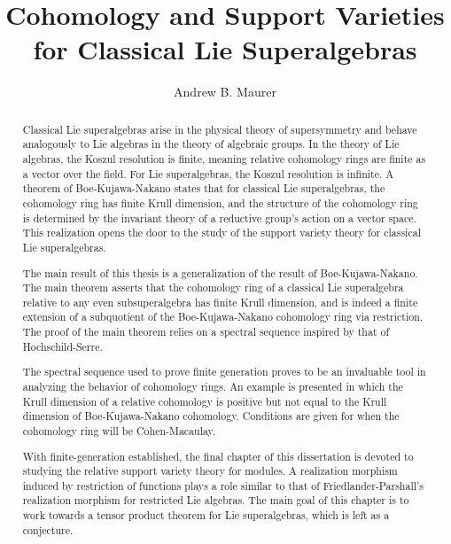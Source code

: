\documentclass[12pt]{report}
\title{Cohomology and Support Varieties\\
  for Classical Lie Superalgebras}
\author{Andrew B. Maurer}
\begin{document}

\begin{abstract}
  Classical Lie superalgebras arise in the physical theory of supersymmetry and behave analogously to Lie algebras in the theory of algebraic groups. In the theory of Lie algebras, the Koszul resolution is finite, meaning relative cohomology rings are finite as a vector over the field. For Lie superalgebras, the Koszul resolution is infinite. A theorem of Boe-Kujawa-Nakano states that for classical Lie superalgebras, the cohomology ring has finite Krull dimension, and the structure of the cohomology ring is determined by the invariant theory of a reductive group's action on a vector space. This realization opens the door to the study of the support variety theory for classical Lie superalgebras.
  
  The main result of this thesis is a generalization of the result of Boe-Kujawa-Nakano. The main theorem asserts that the cohomology ring of a classical Lie superalgebra relative to any even subsuperalgebra has finite Krull dimension, and is indeed a finite extension of a subquotient of the Boe-Kujawa-Nakano cohomology ring via restriction. The proof of the main theorem relies on a spectral sequence inspired by that of Hochschild-Serre.

  The spectral sequence used to prove finite generation proves to be an invaluable tool in analyzing the behavior of cohomology rings. An example is presented in which the Krull dimension of a relative cohomology is positive but not equal to the Krull dimension of Boe-Kujawa-Nakano cohomology. Conditions are given for when the cohomology ring will be Cohen-Macaulay.

  With finite-generation established, the final chapter of this dissertation is devoted to studying the relative support variety theory for modules. A realization morphism induced by restriction of functions plays a role similar to that of Friedlander-Parshall's realization morphism for restricted Lie algebras. The main goal of this chapter is to work towards a tensor product theorem for Lie superalgebras, which is left as a conjecture. 




\end{abstract}
\end{document}
